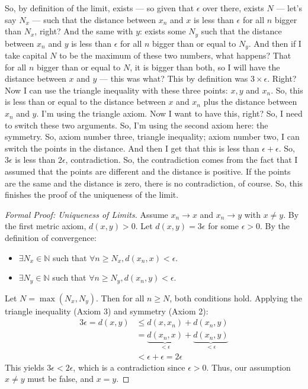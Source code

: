 \begin{spoken-clean}[00:11:03 - 00:12:38]
So, by definition of the limit, exists — so given that $\epsilon$ over there, exists $N$ — let's say $N_x$ — such that the distance between $x_n$ and $x$ is less than $\epsilon$ for all $n$ bigger than $N_x$, right? And the same with $y$: exists some $N_y$ such that the distance between $x_n$ and $y$ is less than $\epsilon$ for all $n$ bigger than or equal to $N_y$. And then if I take capital $N$ to be the maximum of these two numbers, what happens? That for all $n$ bigger than or equal to $N$, it is bigger than both, so I will have the distance between $x$ and $y$ — this was what? This by definition was $3 \times \epsilon$. Right? Now I can use the triangle inequality with these three points: $x, y$ and $x_n$. So, this is less than or equal to the distance between $x$ and $x_n$ plus the distance between $x_n$ and $y$. I'm using the triangle axiom. Now I want to have this, right? So, I need to switch these two arguments. So, I'm using the second axiom here: the symmetry. So, axiom number three, triangle inequality; axiom number two, I can switch the points in the distance. And then I get that this is less than $\epsilon + \epsilon$. So, $3\epsilon$ is less than $2\epsilon$, contradiction. So, the contradiction comes from the fact that I assumed that the points are different and the distance is positive. If the points are the same and the distance is zero, there is no contradiction, of course. So, this finishes the proof of the uniqueness of the limit.
\end{spoken-clean}

\begin{proof}[Formal Proof: Uniqueness of Limits]
Assume $x_n \to x$ and $x_n \to y$ with $x \neq y$. By the first metric axiom, $d(x, y) > 0$. Let $d(x, y) = 3\epsilon$ for some $\epsilon > 0$.
By the definition of convergence:
\begin{itemize}
    \item $\exists N_x \in \mathbb{N}$ such that $\forall n \ge N_x, d(x_n, x) < \epsilon$.
    \item $\exists N_y \in \mathbb{N}$ such that $\forall n \ge N_y, d(x_n, y) < \epsilon$.
\end{itemize}
Let $N = \max(N_x, N_y)$. Then for all $n \ge N$, both conditions hold. Applying the triangle inequality (Axiom 3) and symmetry (Axiom 2):
\begin{align*}
3\epsilon = d(x, y) &\le d(x, x_n) + d(x_n, y) \\
&= \underbrace{d(x_n, x)}_{< \epsilon} + \underbrace{d(x_n, y)}_{< \epsilon} \\
&< \epsilon + \epsilon = 2\epsilon
\end{align*}
This yields $3\epsilon < 2\epsilon$, which is a contradiction since $\epsilon > 0$. Thus, our assumption $x \neq y$ must be false, and $x = y$.
\end{proof}

